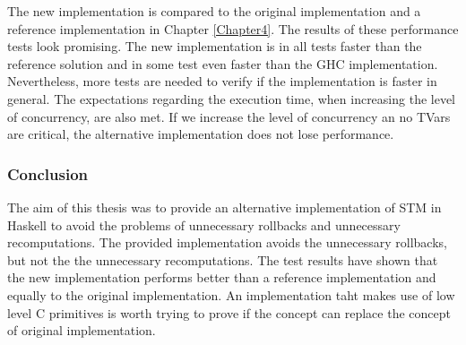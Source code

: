 The new implementation is compared to the original implementation and a reference implementation in
Chapter \ref{Chapter4}. The results of these performance tests look promising. The new implementation
is in all tests faster than the reference solution and in some test even faster than the GHC implementation.
Nevertheless, more tests are needed to verify if the implementation is faster in general. The expectations 
regarding the execution time, when increasing the level of concurrency, are also met. If we increase the 
level of concurrency an no TVars are critical, the alternative implementation does not lose performance.

\subsubsection{Conclusion}
The aim of this thesis was to provide an alternative implementation of STM in Haskell to avoid the 
problems of unnecessary rollbacks and unnecessary recomputations. The provided implementation 
avoids the unnecessary rollbacks, but not the the unnecessary recomputations. The test results 
have shown that the new implementation performs better than a reference implementation and equally
to the original implementation. An implementation taht makes use of low level C primitives is 
worth trying to prove if the concept can replace the concept of original implementation.  